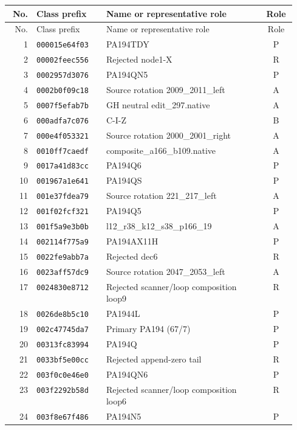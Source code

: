 \begingroup\small
\begin{longtable}{@{}r l p{0.55\linewidth} c@{}}
\toprule No. & Class prefix & Name or representative role & Role\\\midrule\endfirsthead
\toprule No. & Class prefix & Name or representative role & Role\\\midrule\endhead
1 & \texttt{000015e64f03} & PA194TDY & P \\
2 & \texttt{00002feec556} & Rejected node1-X & R \\
3 & \texttt{0002957d3076} & PA194QN5 & P \\
4 & \texttt{0002b0f09c18} & Source rotation 2009\_2011\_left & A \\
5 & \texttt{0007f5efab7b} & GH neutral edit\_297.native & A \\
6 & \texttt{000adfa7c076} & C-I-Z & B \\
7 & \texttt{000e4f053321} & Source rotation 2000\_2001\_right & A \\
8 & \texttt{0010ff7caedf} & composite\_a166\_b109.native & A \\
9 & \texttt{0017a41d83cc} & PA194Q6 & P \\
10 & \texttt{001967a1e641} & PA194QS & P \\
11 & \texttt{001e37fdea79} & Source rotation 221\_217\_left & A \\
12 & \texttt{001f02fcf321} & PA194Q5 & P \\
13 & \texttt{001f5a9e3b0b} & l12\_r38\_k12\_s38\_p166\_19 & A \\
14 & \texttt{002114f775a9} & PA194AX11H & P \\
15 & \texttt{0022fe9abb7a} & Rejected dec6 & R \\
16 & \texttt{0023aff57dc9} & Source rotation 2047\_2053\_left & A \\
17 & \texttt{0024830e8712} & Rejected scanner/loop composition loop9 & R \\
18 & \texttt{0026de8b5c10} & PA1944L & P \\
19 & \texttt{002c47745da7} & Primary PA194 (67/7) & P \\
20 & \texttt{00313fc83994} & PA194Q & P \\
21 & \texttt{0033bf5e00cc} & Rejected append-zero tail & R \\
22 & \texttt{003f0c0e46e0} & PA194QN6 & P \\
23 & \texttt{003f2292b58d} & Rejected scanner/loop composition loop6 & R \\
24 & \texttt{003f8e67f486} & PA194N5 & P \\

\end{longtable}
